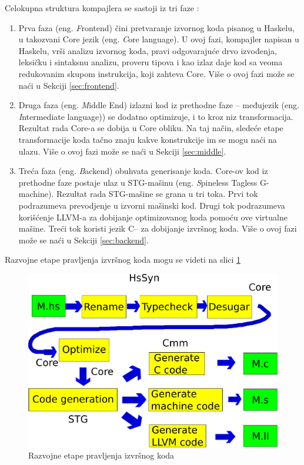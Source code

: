 Celokupna struktura kompajlera se sastoji iz tri faze :
\begin{enumerate}
	\item Prva faza (eng. {\emph Frontend}) čini pretvaranje izvornog koda pisanog u Haskelu, u takozvani Core jezik (eng. {\emph Core language}). U ovoj fazi, kompajler napisan u Haskelu, vrši analizu izvornog koda, pravi odgovarajuće drvo izvođenja, leksičku i sintaksnu analizu, proveru tipova i kao izlaz daje kod sa veoma redukovanim skupom instrukcija, koji zahteva Core. Više o ovoj fazi može se naći u Sekciji \ref{sec:frontend}.
	\item Druga faza (eng. {\emph Middle End}) izlazni kod iz prethodne faze – međujezik (eng. {\emph Intermediate language)}) se dodatno optimizuje, i to kroz niz transformacija. Rezultat rada Core-a se dobija u Core obliku. Na taj način, sledeće etape transformacije koda tačno znaju kakve konstrukcije im se mogu naći na ulazu.  Više o ovoj fazi može se naći u Sekciji \ref{sec:middle}.
	\item Treća faza (eng. {\emph Backend}) obuhvata generisanje koda. Core-ov kod iz prethodne faze postaje ulaz u STG-mašinu (eng. {\emph Spineless Tagless G-machine}). Rezultat rada STG-mašine se grana u tri toka. Prvi tok podrazumeva prevodjenje u izvorni mašinski kod. Drugi tok podrazumeva korišćenje LLVM-a za dobijanje optimizovanog koda pomoću ove virtualne mašine. Treći tok koristi jezik C-- za dobijanje izvršnog koda. Više o ovoj fazi može se naći u Sekciji \ref{sec:backend}.
\end{enumerate}

Razvojne etape pravljenja izvršnog koda mogu se videti na slici \ref{fig:razvojneEtaple}

\begin{figure}[h!]
	\begin{center}
		\includegraphics[scale=0.30]{resources/razvojneEtape.png}
	\end{center}
	\caption{Razvojne etape pravljenja izvršnog koda}
	\label{fig:razvojneEtaple}
\end{figure}